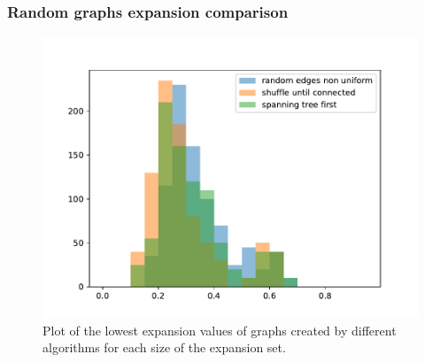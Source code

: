 \documentclass{beamer}
\begin{document}
\begin{frame}
\frametitle{Random graphs expansion comparison}
\begin{figure}
	\centering
	\includegraphics[scale=0.5]{figures/creation_algorithm_log_lowest_expansion.pdf}
	\caption[Plot lowest expansion for different algorithms]{Plot of the lowest expansion values of graphs created by different algorithms for each size of the expansion set. \label{fig:plot_lowest_expansion_each_size}}
\end{figure}

\end{frame}
\end{document}

